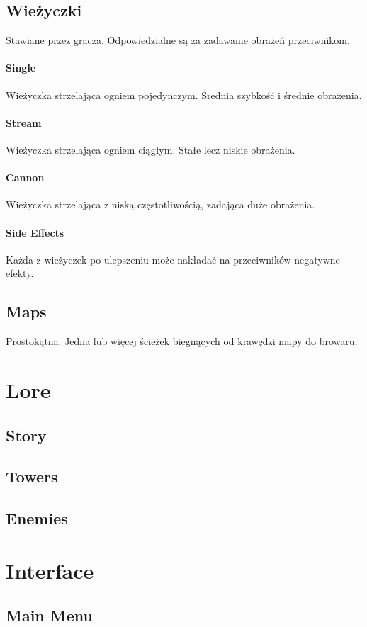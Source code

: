 \documentclass[12pt]{article}
\begin{document}
\subsection{Wieżyczki}
	Stawiane przez gracza. Odpowiedzialne są za zadawanie obrażeń przeciwnikom.
\paragraph{Single}
	Wieżyczka strzelająca ogniem pojedynczym. Średnia szybkość i średnie obrażenia.
\paragraph{Stream}
	Wieżyczka strzelająca ogniem ciągłym. Stałe lecz niskie obrażenia.
\paragraph{Cannon}
	Wieżyczka strzelająca z niską częstotliwością, zadająca duże obrażenia.
\paragraph{Side Effects}
	Każda z wieżyczek po ulepszeniu może nakładać na przeciwników negatywne efekty.
\subsection{Maps}
	Prostokątna. Jedna lub więcej ścieżek biegnących od krawędzi mapy do browaru.

\newpage
\section{Lore}
\subsection{Story}
\subsection{Towers}
\subsection{Enemies}

\newpage
\section{Interface}
\subsection{Main Menu}
\end{document}
